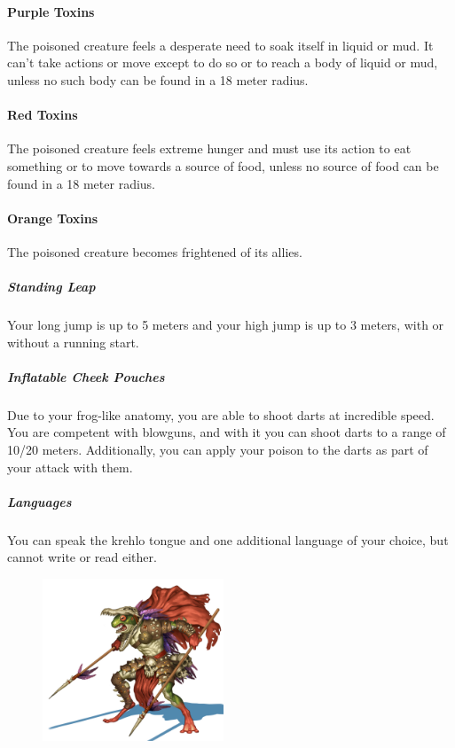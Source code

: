         \paragraph{Purple Toxins} The poisoned creature feels a desperate need to soak itself in liquid or mud.
        It can't take actions or move except to do so or to reach a body of liquid or mud, unless no such body can be found in a 18 meter radius.

        \paragraph{Red Toxins} The poisoned creature feels extreme hunger and must use its action to eat something or to move towards a source of food, unless no source of food can be found in a 18 meter radius.

        \paragraph{Orange Toxins} The poisoned creature becomes frightened of its allies.

    \subparagraph{Standing Leap} Your long jump is up to 5 meters and your high jump is up to 3 meters, with or without a running start.


    \subparagraph{Inflatable Cheek Pouches} Due to your frog-like anatomy, you are able to shoot darts at incredible speed.
    You are competent with blowguns, and with it you can shoot darts to a range of 10/20 meters.
    Additionally, you can apply your poison to the darts as part of your attack with them.


    \subparagraph{Languages} You can speak the krehlo tongue and one additional language of your choice, but cannot write or read either.

\begin{figure}[!b]
    \centering
    \includegraphics[width=0.48\textwidth]{04kins/img/18grung_warrior.jpg}
\end{figure}


